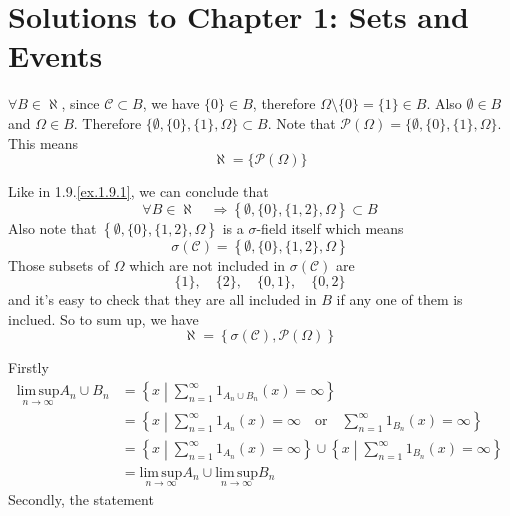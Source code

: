 \section{Solutions to Chapter 1: Sets and Events}
\label{sec:solutions-chapter-1}

\setcounter{Lcount}{0}
\begin{list}{1.9.}{}
\item \label{ex.1.9.1}
  $\forall B \in \aleph$, since $\mathcal{C}\subset B$, we have $\{0\}\in B$, therefore $\Omega\setminus \{0\}=\{1\}\in B$. Also $\emptyset\in B$ and $\Omega\in B$. Therefore $\{\emptyset,\{0\}, \{1\}, \Omega\}\subset B$. Note that $\mathcal{P}\left(\Omega\right) = \{\emptyset,\{0\}, \{1\}, \Omega\}$. This means
  \[
    \aleph = \{\mathcal{P}\left(\Omega\right)\}
  \]
\item \label{ex.1.9.2}Like in 1.9.\ref{ex.1.9.1}, we can conclude that
  \[
    \forall B \in \aleph \quad \Rightarrow \left\{\emptyset, \{0\}, \{1,2\}, \Omega\right\} \subset B
  \]
  Also note that $\left\{\emptyset, \{0\}, \{1,2\}, \Omega\right\}$ is a $\sigma$-field itself which means
  \[
    \sigma\left(\mathcal{C}\right) = \left\{\emptyset, \{0\}, \{1,2\}, \Omega\right\}
  \]
  Those subsets of $\Omega$ which are not included in $\sigma(\mathcal{C})$ are
  \[
    \{1\},\quad \{2\},\quad \{0,1\},\quad \{0,2\}
  \]
  and it's easy to check that they are all included in $B$ if any one of them is inclued. So to sum up, we have
  \[
    \aleph = \left\{\sigma(\mathcal{C}), \mathcal{P}\left(\Omega\right)\right\}
  \]
\item \label{ex.1.9.3} Firstly
  \[
    \begin{aligned}
      \underset{n\to\infty}{\mathrm{lim\,sup}} A_n\cup B_n
      &= \left\{x\middle| \sum\limits_{n=1}^\infty 1_{A_n\cup B_n}\left(x\right)=\infty\right\}    \\
      &= \left\{x\middle| \sum\limits_{n=1}^\infty 1_{A_n}\left(x\right)=\infty\quad \mathrm{or}\quad
         \sum\limits_{n=1}^\infty 1_{B_n}\left(x\right)=\infty\right\}    \\
      &= \left\{x\middle| \sum\limits_{n=1}^\infty 1_{A_n}\left(x\right)=\infty \right\} \cup
         \left\{x\middle| \sum\limits_{n=1}^\infty 1_{B_n}\left(x\right)=\infty\right\}    \\
      &= \underset{n\to\infty}{\mathrm{lim\,sup}} A_n \cup \underset{n\to\infty}{\mathrm{lim\,sup}} B_n
    \end{aligned}
  \]
  Secondly, the statement

\end{list}
